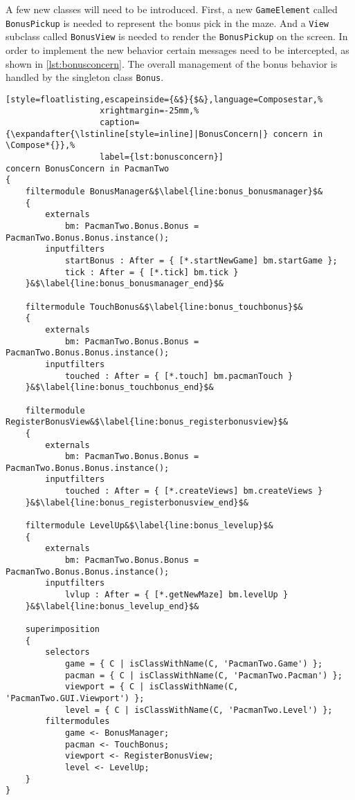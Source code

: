 A few new classes will need to be introduced. 
First, a new \lstinline|GameElement| called \lstinline|BonusPickup| is needed to represent the bonus pick in the maze. 
And a \lstinline|View| subclass called \lstinline|BonusView| is needed to render the \lstinline|BonusPickup| on the screen.
In order to implement the new behavior certain messages need to be intercepted, as shown in \autoref{lst:bonusconcern}. 
The overall management of the bonus behavior is handled by the singleton class \lstinline|Bonus|.

\begin{lstlisting}[style=floatlisting,escapeinside={&$}{$&},language=Composestar,%
                   xrightmargin=-25mm,%
                   caption={\expandafter{\lstinline[style=inline]|BonusConcern|} concern in \Compose*{}},%
                   label={lst:bonusconcern}]
concern BonusConcern in PacmanTwo
{
	filtermodule BonusManager&$\label{line:bonus_bonusmanager}$&
	{
		externals
			bm: PacmanTwo.Bonus.Bonus = PacmanTwo.Bonus.Bonus.instance();
		inputfilters
			startBonus : After = { [*.startNewGame] bm.startGame };
			tick : After = { [*.tick] bm.tick }
	}&$\label{line:bonus_bonusmanager_end}$&

	filtermodule TouchBonus&$\label{line:bonus_touchbonus}$&
	{
		externals
			bm: PacmanTwo.Bonus.Bonus = PacmanTwo.Bonus.Bonus.instance();
		inputfilters
			touched : After = { [*.touch] bm.pacmanTouch }
	}&$\label{line:bonus_touchbonus_end}$&

	filtermodule RegisterBonusView&$\label{line:bonus_registerbonusview}$&
	{
		externals
			bm: PacmanTwo.Bonus.Bonus = PacmanTwo.Bonus.Bonus.instance();
		inputfilters
			touched : After = { [*.createViews] bm.createViews }
	}&$\label{line:bonus_registerbonusview_end}$&

	filtermodule LevelUp&$\label{line:bonus_levelup}$&
	{
		externals
			bm: PacmanTwo.Bonus.Bonus = PacmanTwo.Bonus.Bonus.instance();
		inputfilters
			lvlup : After = { [*.getNewMaze] bm.levelUp }
	}&$\label{line:bonus_levelup_end}$&

	superimposition
	{
		selectors
			game = { C | isClassWithName(C, 'PacmanTwo.Game') };
			pacman = { C | isClassWithName(C, 'PacmanTwo.Pacman') };
			viewport = { C | isClassWithName(C, 'PacmanTwo.GUI.Viewport') };
			level = { C | isClassWithName(C, 'PacmanTwo.Level') };
		filtermodules
			game <- BonusManager;
			pacman <- TouchBonus;
			viewport <- RegisterBonusView;
			level <- LevelUp;
	}
}
\end{lstlisting}

